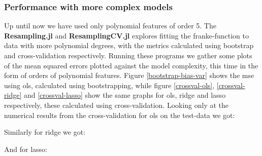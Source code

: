 \documentclass{article}
\begin{document}
\subsubsection{Performance with more complex models}
Up until now we have used only polynomial features of order 5. The
\textbf{Resampling.jl} and \textbf{ResamplingCV.jl} explores fitting the
franke-function to data with more polynomial degrees, with the metrics
calculated using bootstrap and cross-validation respectively. Running these
programs we gather some plots of the mean squared errors plotted against the
model complexity, this time in the form of orders of polynomial features. Figure
\ref{bootstrap-bias-var} shows the mse using ols, calculated using
bootstrapping, while figure \ref{crossval-ols}, \ref{crossval-ridge} and
\ref{crossval-lasso} show the same graphs for ols, ridge and lasso respectively,
these calculated using cross-validation. Looking only at the numerical results
from the cross-validation for ols on the test-data we got:

\begin{table}[htpb!]
\end{table}

Similarly for ridge we got:

\begin{table}[htpb!]
\end{table}

And for lasso:
\begin{table}[htpb!]
\end{table}
\end{document}
